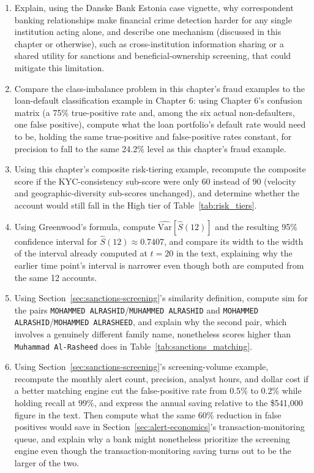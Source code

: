 \documentclass[../ai_in_finance]{subfiles}
\begin{document}
\begin{enumerate}
    \item Explain, using the Danske Bank Estonia case vignette, why correspondent banking relationships make financial crime detection harder for any single institution acting alone, and describe one mechanism (discussed in this chapter or otherwise), such as cross-institution information sharing or a shared utility for sanctions and beneficial-ownership screening, that could mitigate this limitation.
    \item Compare the class-imbalance problem in this chapter's fraud examples to the loan-default classification example in Chapter 6: using Chapter 6's confusion matrix (a 75\% true-positive rate and, among the six actual non-defaulters, one false positive), compute what the loan portfolio's default rate would need to be, holding the same true-positive and false-positive rates constant, for precision to fall to the same 24.2\% level as this chapter's fraud example.
    \item Using this chapter's composite risk-tiering example, recompute the composite score if the KYC-consistency sub-score were only $60$ instead of $90$ (velocity and geographic-diversity sub-scores unchanged), and determine whether the account would still fall in the High tier of Table~\ref{tab:risk_tiers}.
    \item Using Greenwood's formula, compute $\widehat{\text{Var}}[\hat S(12)]$ and the resulting 95\% confidence interval for $\hat S(12)\approx0.7407$, and compare its width to the width of the interval already computed at $t=20$ in the text, explaining why the earlier time point's interval is narrower even though both are computed from the same 12 accounts.
    \item Using Section~\ref{sec:sanctions-screening}'s similarity definition, compute $\text{sim}$ for the pairs \texttt{MOHAMMED ALRASHID}/\texttt{MUHAMMED ALRASHID} and \texttt{MOHAMMED ALRASHID}/\texttt{MOHAMMED ALRASHEED}, and explain why the second pair, which involves a genuinely different family name, nonetheless scores higher than \texttt{Muhammad Al-Rasheed} does in Table~\ref{tab:sanctions_matching}.
    \item Using Section~\ref{sec:sanctions-screening}'s screening-volume example, recompute the monthly alert count, precision, analyst hours, and dollar cost if a better matching engine cut the false-positive rate from $0.5\%$ to $0.2\%$ while holding recall at $99\%$, and express the annual saving relative to the \$541,000 figure in the text. Then compute what the same $60\%$ reduction in false positives would save in Section~\ref{sec:alert-economics}'s transaction-monitoring queue, and explain why a bank might nonetheless prioritize the screening engine even though the transaction-monitoring saving turns out to be the larger of the two.

\end{enumerate}
\end{document}
